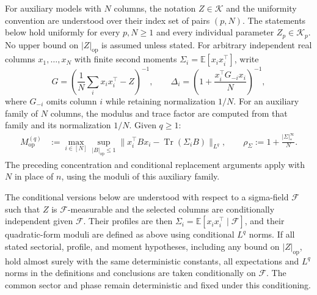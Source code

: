 \documentclass[EJP, preprint, NODS, nobera, nofontexpansion]{ejpecp}
\DeclareMathOperator{\op}{op}
\DeclareMathOperator{\tr}{Tr}
\begin{document}
For auxiliary models with $N$ columns, the notation $Z\in\mathcal K$
and the uniformity convention are understood over their index set of
pairs $(p,N)$. The statements below hold uniformly for every $p,N\geq1$
and every individual parameter $Z_p\in\mathcal K_p$.
No upper bound on $|Z|_{\op}$ is assumed unless stated.
For arbitrary independent real columns $x_1,\ldots,x_N$ with finite second
moments $\Sigma_i=\mathbb E[x_ix_i^\top]$, write
\[
 G=\left(\frac1N\sum_i x_ix_i^\top-Z\right)^{-1},\qquad
 \Delta_i=\left(1+\frac{x_i^\top G_{-i}x_i}{N}\right)^{-1},
\]
where $G_{-i}$ omits column $i$ while retaining normalization $1/N$.
For an auxiliary family of $N$ columns, the modulus and trace factor
are computed from that family and its normalization $1/N$. Given $q\geq1$:
\begin{align*}
 M_{\op}^{(q)}&:=\max_{i\in[N]}\sup_{|B|_{\op}\leq1}
 \|x_i^\top Bx_i-\tr(\Sigma_iB)\|_{L^q},
 \qquad \rho_\Sigma:=1+\frac{|\Sigma|_*^\infty}N.
\end{align*}
The preceding concentration and conditional replacement arguments apply
with $N$ in place of $n$, using the moduli of this auxiliary family.

The conditional versions below are understood with respect to a sigma-field
$\mathscr F$ such that $Z$ is $\mathscr F$-measurable and the selected
columns are conditionally independent given $\mathscr F$. Their profiles
are then $\Sigma_i=\mathbb E[x_ix_i^\top\mid\mathscr F]$, and their
quadratic-form moduli are defined as above using conditional $L^q$ norms.
If all stated sectorial, profile, and moment hypotheses, including
any bound on \(|Z|_{\op}\), hold almost surely with the same
deterministic constants, all expectations and \(L^q\) norms in
the definitions and conclusions are taken conditionally on
\(\mathscr F\). The common sector and phase remain deterministic and
fixed under this conditioning.
\end{document}
